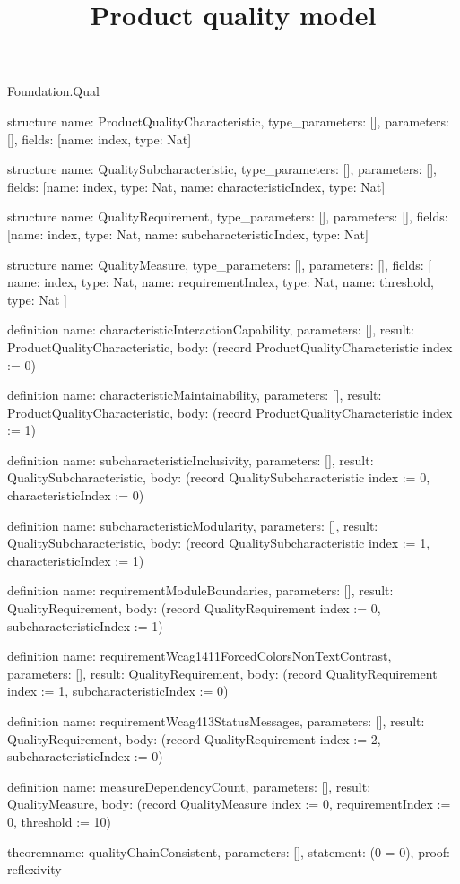 \begin{lexlean}{Foundation.Qual}
\title{Product quality model}
\begin{semanticmodule}
structure{
  name: ProductQualityCharacteristic,
  type_parameters: [],
  parameters: [],
  fields: [{name: index, type: Nat}]
}

structure{
  name: QualitySubcharacteristic,
  type_parameters: [],
  parameters: [],
  fields: [{name: index, type: Nat}, {name: characteristicIndex, type: Nat}]
}

structure{
  name: QualityRequirement,
  type_parameters: [],
  parameters: [],
  fields: [{name: index, type: Nat}, {name: subcharacteristicIndex, type: Nat}]
}

structure{
  name: QualityMeasure,
  type_parameters: [],
  parameters: [],
  fields: [
    {name: index, type: Nat},
    {name: requirementIndex, type: Nat},
    {name: threshold, type: Nat}
  ]
}

definition{
  name: characteristicInteractionCapability,
  parameters: [],
  result: ProductQualityCharacteristic,
  body: (record ProductQualityCharacteristic {index := 0})
}

definition{
  name: characteristicMaintainability,
  parameters: [],
  result: ProductQualityCharacteristic,
  body: (record ProductQualityCharacteristic {index := 1})
}

definition{
  name: subcharacteristicInclusivity,
  parameters: [],
  result: QualitySubcharacteristic,
  body: (record QualitySubcharacteristic {index := 0, characteristicIndex := 0})
}

definition{
  name: subcharacteristicModularity,
  parameters: [],
  result: QualitySubcharacteristic,
  body: (record QualitySubcharacteristic {index := 1, characteristicIndex := 1})
}

definition{
  name: requirementModuleBoundaries,
  parameters: [],
  result: QualityRequirement,
  body: (record QualityRequirement {index := 0, subcharacteristicIndex := 1})
}

definition{
  name: requirementWcag1411ForcedColorsNonTextContrast,
  parameters: [],
  result: QualityRequirement,
  body: (record QualityRequirement {index := 1, subcharacteristicIndex := 0})
}

definition{
  name: requirementWcag413StatusMessages,
  parameters: [],
  result: QualityRequirement,
  body: (record QualityRequirement {index := 2, subcharacteristicIndex := 0})
}

definition{
  name: measureDependencyCount,
  parameters: [],
  result: QualityMeasure,
  body: (record QualityMeasure {index := 0, requirementIndex := 0, threshold := 10})
}

theorem{name: qualityChainConsistent, parameters: [], statement: (0 = 0), proof: reflexivity{}}
\end{semanticmodule}
\end{lexlean}

